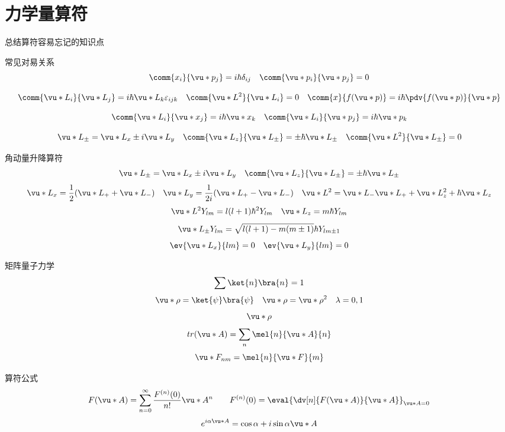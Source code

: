     \section{力学量算符}
        \begin{formal}
            总结算符容易忘记的知识点   
            
            常见对易关系
            $$ \comm{x_{i}}{\vu*{p}_{j}} = i \hbar \delta_{ij} \quad \comm{\vu*{p}_{i}}{\vu*{p}_{j}} = 0 $$
            
            $$\comm{\vu*{L}_{i}}{\vu*{L}_{j}} = i\hbar \vu*{L}_{k} \varepsilon_{ijk}  
            \quad \comm{\vu*{L^{2}}}{\vu*{L}_{i}} = 0 \quad \comm{x}{f(\vu*{p})} = i \hbar \pdv{f(\vu*{p})}{\vu*{p}}
            $$

            $$  \comm{\vu*{L}_{i}}{\vu*{x}_{j}} = i \hbar \vu*{x}_{k} \quad \comm{\vu*{L}_{i}}{\vu*{p}_{j}} = i \hbar \vu*{p}_{k}
            $$

            $$\vu*{L}_{\pm} = \vu*{L}_{x} \pm  i \vu*{L}_{y} \quad \comm{\vu*{L}_{z}}{\vu*{{L}}_{\pm}} = \pm \hbar \vu*{L}_{\pm} \quad \comm{\vu*{L}^{2}}{\vu*{{L}}_{\pm}} = 0  $$

            角动量升降算符
            $$ \vu*{L}_{\pm} = \vu*{L}_{x} \pm  i \vu*{L}_{y} \quad \comm{\vu*{L}_{z}}{\vu*{{L}}_{\pm}} = \pm \hbar \vu*{L}_{\pm} $$
            $$ \vu*{L}_{x}  = \frac{1}{2} (\vu*{L}_{+} + \vu*{L}_{-}) \quad \vu*{L}_{y} = \frac{1}{2i} (\vu*{L}_{+} - \vu*{L}_{-}) \quad \vu*{L}^{2} = \vu*{L}_{-} \vu*{L}_{+} + \vu*{L}_{z}^{2} + \hbar \vu*{L}_{z} $$
            $$ \vu*{L}^{2} Y_{lm} = l(l+1)\hbar^{2} Y_{lm} \quad \vu*{L}_{z} = m\hbar Y_{lm}$$
            $$ \vu*{L}_{\pm} Y_{lm} = \sqrt{l(l+1) - m(m \pm 1)}  \hbar Y_{lm \pm 1} $$
            $$ \ev{\vu*{L}_{x}}{lm} = 0 \quad \ev{\vu*{L}_{y}}{lm} = 0  $$

            矩阵量子力学
            $$ \sum \ket{n}\bra{n} = 1 $$
            $$ \vu*{\rho} = \ket{\psi} \bra{\psi} \quad \vu*{\rho} =  \vu*{\rho}^{2} \quad \lambda = 0,1$$
            $$ \vu*{\rho} $$
            $$ tr(\vu*{A}) = \sum_{n} \mel{n}{\vu*{A}}{n} $$
            $$ \vu*{F}_{nm} = \mel{n}{\vu*{F}}{m} $$
                
            
            
            算符公式
            $$ F(\vu*{A}) = \sum_{n=0}^{\infty} \frac{ F^{(n)}(0) }{n!} \vu*{A}^{n} \qquad F^{(n)}(0) = \eval{\dv[n]{F(\vu*{A})}{\vu*{A}} }_{\vu*{A}=0}  $$
            $$ e^{i \alpha \vu*{A}}  =  \cos{\alpha} + i \sin{\alpha}\vu*{A} $$


\end{formal}

